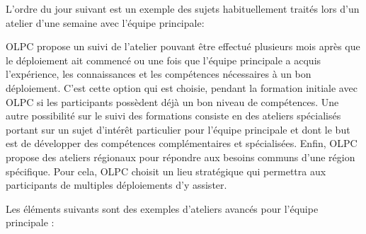 \documentclass[12pt]{article}
\begin{document}
L'ordre du jour suivant est un exemple des sujets habituellement traités
lors d'un atelier d'une semaine avec l'équipe principale: 

OLPC propose un suivi de l'atelier pouvant être effectué plusieurs mois
après que le déploiement ait commencé ou une fois que l'équipe principale a
acquis l'expérience, les connaissances et les compétences nécessaires à un
bon déploiement. C'est cette option qui est choisie, pendant la formation
initiale avec OLPC si les participants possèdent déjà un bon niveau de
compétences. Une autre possibilité sur le suivi des formations consiste en
des ateliers spécialisés portant sur un sujet d'intérêt particulier pour
l'équipe principale et  dont le but est de développer des compétences
complémentaires et spécialisées. Enfin, OLPC propose des ateliers régionaux
pour répondre aux besoins communs d'une région spécifique. Pour cela, OLPC
choisit un lieu stratégique qui permettra aux participants de multiples
déploiements d'y assister.

Les éléments suivants sont des exemples d'ateliers avancés pour l'équipe
principale :
\end{document}
